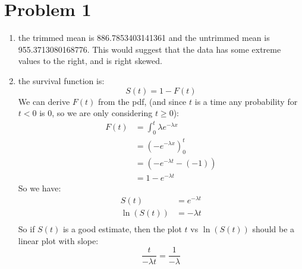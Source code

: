 \documentclass{article}
\title{\thetitle}
\author{\theauthor}
\begin{document}
\maketitle
\section*{Problem 1}
\begin{enumerate}
\item the trimmed mean is 886.7853403141361 and the untrimmed mean is 955.3713080168776. This would suggest that the data has some extreme values to the right, and is right skewed. \\
\item the survival function is: \\
\[
S(t) = 1 - F(t)
\]
We can derive $F(t)$ from the pdf, (and since $t$ is a time any probability for $t < 0$ is 0, so we are only considering $t \geq 0$): \\
\begin{align*}
F(t) &= \int_{0}^{t}\lambda e^{-\lambda x} \\
&= (-e^{-\lambda x})_{0}^{t} \\
&= (-e^{-\lambda t} - (-1)) \\
&= 1 - e^{-\lambda t}
\end{align*}
So we have: \\
\begin{align*}
S(t) &= e^{-\lambda t} \\
\ln(S(t)) &= -\lambda t \\ 
\end{align*}
So if $S(t)$ is a good estimate, then the plot $t$ vs $\ln(S(t))$ should be a linear plot with slope: \\
\[
\frac{t}{-\lambda t} = \frac{1}{-\lambda}
\]


\end{enumerate}
\end{document}
